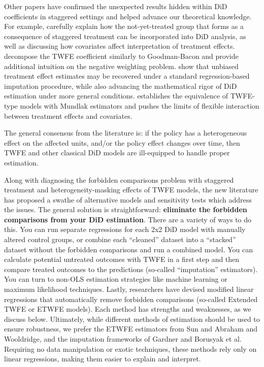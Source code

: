 \documentclass[12pt]{article}
\begin{document}
Other papers have confirmed the unexpected results hidden within DiD coefficients in staggered settings and helped advance our theoretical knowledge. For example, \citet{CS2021} carefully explain how the not-yet-treated group that forms as a consequence of staggered treatment can be incorporated into DiD analysis, as well as discussing how covariates affect interpretation of treatment effects. \citet{de2020two} decompose the TWFE coefficient similarly to Goodman-Bacon and provide additional intuition on the negative weighting problem. \citet{borusyak2024revisiting} show that unbiased treatment effect estimates may be recovered under a standard regression-based imputation procedure, while also advancing the mathematical rigor of DiD estimation under more general conditions. \citet{wooldridge2021two} establishes the equivalence of TWFE-type models with Mundlak estimators and pushes the limits of flexible interaction between treatment effects and covariates.

The general consensus from the literature is: if the policy has a heterogeneous effect on the affected units, and/or the policy effect changes over time, then TWFE and other classical DiD models are ill-equipped to handle proper estimation.

Along with diagnosing the forbidden comparisons problem with staggered treatment and heterogeneity-masking effects of TWFE models, the new literature has proposed a swathe of alternative models and sensitivity tests which address the issues. The general solution is straightforward: \textbf{eliminate the forbidden comparisons from your DiD estimation}. There are a variety of ways to do this. You can run separate regressions for each 2x2 DiD model with manually altered control groups, or combine each “cleaned” dataset into a “stacked” dataset without the forbidden comparisons and run a combined model. You can calculate potential untreated outcomes with TWFE in a first step and then compare treated outcomes to the predictions (so-called “imputation” estimators). You can turn to non-OLS estimation strategies like machine learning or maximum likelihood techniques. Lastly, researchers have devised modified linear regressions that automatically remove forbidden comparisons (so-called Extended TWFE or ETWFE models).  Each method has strengths and weaknesses, as we discuss below. Ultimately, while different methods of estimation should be used to ensure robustness, we prefer the ETWFE estimators from Sun and Abraham and Wooldridge, and the imputation frameworks of Gardner and Borusyak et al.  Requiring no data manipulation or exotic techniques, these methods rely only on linear regressions, making them easier to explain and interpret.
\end{document}
